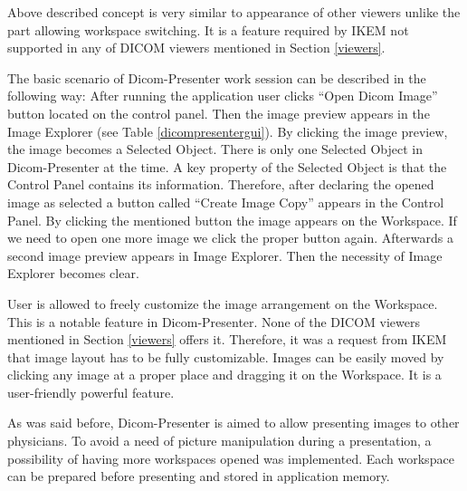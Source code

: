 Above described concept is very similar to appearance of other viewers unlike the part allowing workspace switching. It is a feature required by IKEM not supported in any of DICOM viewers mentioned in Section \ref{viewers}.

The basic scenario of Dicom-Presenter work session can be described in the following way: After running the application user clicks ``Open Dicom Image'' button located on the control panel. Then the image preview appears in the Image Explorer (see Table \ref{dicompresentergui}). By clicking the image preview, the image becomes a Selected Object. There is only one Selected Object in Dicom-Presenter at the time. A key property of the Selected Object is that the Control Panel contains its information. Therefore, after declaring the opened image as selected a button called ``Create Image Copy'' appears in the Control Panel. By clicking the mentioned button the image appears on the Workspace. If we need to open one more image we click the proper button again. Afterwards a second image preview appears in Image Explorer. Then the necessity of Image Explorer becomes clear.

User is allowed to freely customize the image arrangement on the Workspace. This is a notable feature in Dicom-Presenter. None of the DICOM viewers mentioned in Section \ref{viewers} offers it. Therefore, it was a request from IKEM that image layout has to be fully customizable. Images can be easily moved  by clicking any image at a proper place and dragging it on the Workspace.  It is a user-friendly powerful feature.

As was said before, Dicom-Presenter is aimed to allow presenting images to other physicians. To avoid a need of picture manipulation during a presentation, a possibility of having more workspaces opened was implemented. Each workspace can be prepared before presenting and stored in application memory.
 
